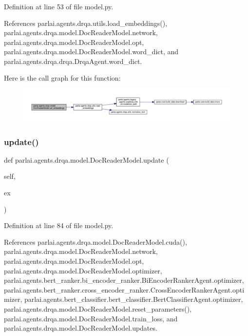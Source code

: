 Definition at line 53 of file model.\+py.



References parlai.\+agents.\+drqa.\+utils.\+load\+\_\+embeddings(), parlai.\+agents.\+drqa.\+model.\+Doc\+Reader\+Model.\+network, parlai.\+agents.\+drqa.\+model.\+Doc\+Reader\+Model.\+opt, parlai.\+agents.\+drqa.\+model.\+Doc\+Reader\+Model.\+word\+\_\+dict, and parlai.\+agents.\+drqa.\+drqa.\+Drqa\+Agent.\+word\+\_\+dict.

Here is the call graph for this function\+:
\nopagebreak
\begin{figure}[H]
\begin{center}
\leavevmode
\includegraphics[width=350pt]{classparlai_1_1agents_1_1drqa_1_1model_1_1DocReaderModel_a6d563b82872da6b70b2801f2acfcac32_cgraph}
\end{center}
\end{figure}
\mbox{\label{classparlai_1_1agents_1_1drqa_1_1model_1_1DocReaderModel_afd9953bd722fe099619e883981e3fc38}} 
\subsubsection{\texorpdfstring{update()}{update()}}
{\footnotesize\ttfamily def parlai.\+agents.\+drqa.\+model.\+Doc\+Reader\+Model.\+update (\begin{DoxyParamCaption}\item[{}]{self,  }\item[{}]{ex }\end{DoxyParamCaption})}



Definition at line 84 of file model.\+py.



References parlai.\+agents.\+drqa.\+model.\+Doc\+Reader\+Model.\+cuda(), parlai.\+agents.\+drqa.\+model.\+Doc\+Reader\+Model.\+network, parlai.\+agents.\+drqa.\+model.\+Doc\+Reader\+Model.\+opt, parlai.\+agents.\+drqa.\+model.\+Doc\+Reader\+Model.\+optimizer, parlai.\+agents.\+bert\+\_\+ranker.\+bi\+\_\+encoder\+\_\+ranker.\+Bi\+Encoder\+Ranker\+Agent.\+optimizer, parlai.\+agents.\+bert\+\_\+ranker.\+cross\+\_\+encoder\+\_\+ranker.\+Cross\+Encoder\+Ranker\+Agent.\+optimizer, parlai.\+agents.\+bert\+\_\+classifier.\+bert\+\_\+classifier.\+Bert\+Classifier\+Agent.\+optimizer, parlai.\+agents.\+drqa.\+model.\+Doc\+Reader\+Model.\+reset\+\_\+parameters(), parlai.\+agents.\+drqa.\+model.\+Doc\+Reader\+Model.\+train\+\_\+loss, and parlai.\+agents.\+drqa.\+model.\+Doc\+Reader\+Model.\+updates.



